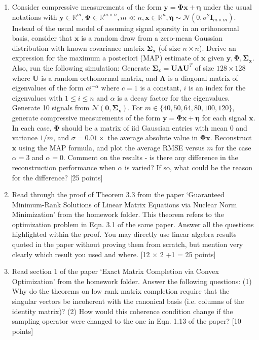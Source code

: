 \documentclass[11pt]{article}
\begin{document}
\begin{enumerate}
\item Consider compressive measurements of the form $\boldsymbol{y} = \boldsymbol{\Phi x} + \boldsymbol{\eta}$ under the usual notations with $\boldsymbol{y} \in \mathbb{R}^m, \boldsymbol{\Phi} \in \mathbb{R}^{m \times n}, m \ll n, \boldsymbol{x} \in \mathbb{R}^n, \boldsymbol{\eta} \sim \mathcal{N}(0,\sigma^2\boldsymbol{I}_{m \times m})$. Instead of the usual model of assuming signal sparsity in an orthonormal basis, consider that $\boldsymbol{x}$ is a random draw from a zero-mean Gaussian distribution with known covariance matrix $\boldsymbol{\Sigma_x}$ (of size $n \times n$). Derive an expression for the maximum a posteriori (MAP) estimate of $\boldsymbol{x}$ given $\boldsymbol{y}, \boldsymbol{\Phi}, \boldsymbol{\Sigma_x}$. Also, run the following simulation:
Generate $\boldsymbol{\Sigma_x} = \boldsymbol{U \Lambda U}^T$ of size $128 \times 128$ where $\boldsymbol{U}$ is a random orthonormal matrix, and $\boldsymbol{\Lambda}$ is a diagonal matrix of eigenvalues of the form $c i^{-\alpha}$ where $c = 1$ is a constant, $i$ is an index for the eigenvalues with $1 \leq i \leq n$ and $\alpha$ is a decay factor for the eigenvalues. Generate 10 signals from $\mathcal{N}(\boldsymbol{0},\boldsymbol{\Sigma_x})$. For $m \in \{40,50,64,80,100,120\}$, generate compressive measurements of the form $\boldsymbol{y} = \boldsymbol{\Phi x} + \boldsymbol{\eta}$ for each signal $\boldsymbol{x}$. In each case, $\boldsymbol{\Phi}$ should be a matrix of iid Gaussian entries with mean 0 and variance $1/m$, and $\sigma = 0.01 \times$ the average absolute value in $\boldsymbol{\Phi x}$. Reconstruct $\boldsymbol{x}$ using the MAP formula, and plot the average RMSE versus $m$ for the case $\alpha = 3$ and $\alpha = 0$. Comment on the results - is there any difference in the reconstruction performance when $\alpha$ is varied? If so, what could be the reason for the difference? \textsf{[25 points]}

\item Read through the proof of Theorem 3.3 from the paper `Guaranteed Minimum-Rank Solutions of Linear Matrix Equations via Nuclear Norm Minimization' from the homework folder. This theorem refers to the optimization problem in Eqn. 3.1 of the same paper. Answer all the questions highlighted within the proof. You may directly use linear algebra results quoted in the paper without proving them from scratch, but mention very clearly which result you used and where. \textsf{[12 $\times$ 2 +1 = 25 points]}

\item Read section 1 of the paper `Exact Matrix Completion via Convex Optimization' from the homework folder. Answer the following questions: (1) Why do the theorems on low rank matrix completion require that the singular vectors be incoherent with the canonical basis (i.e. columns of the identity matrix)? (2) How would this coherence condition change if the sampling operator were changed to the one in Eqn. 1.13 of the paper? \textsf{[10 points]}


\end{enumerate}
\end{document}
